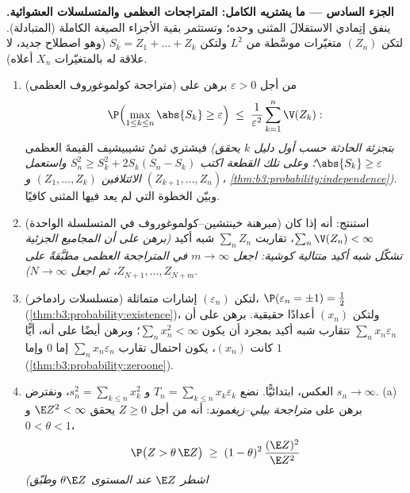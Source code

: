 \begin{problem}
\medskip
\noindent\textbf{الجزء السادس --- ما يشتريه  الكامل:
المتراجحات العظمى والمتسلسلات العشوائية.} ينفق إتِمادي
الاستقلالَ المثنى وحده؛ وتستثمر بقية الأجزاء الصيغة الكاملة
(المتبادلة). لتكن $(Z_n)$ متغيّرات  موسَّطة من $L^2$
ولتكن $S_k = Z_1 + \dots + Z_k$ (وهو اصطلاح جديد، لا علاقة له بالمتغيّرات $X_n$
أعلاه).
\begin{enumerate}[resume]
  \item (متراجحة كولموغوروف العظمى) من أجل $\varepsilon
        > 0$ برهن على
        \[
        \P\Bigl(\max_{1\leq k\leq n}\abs{S_k} \geq
        \varepsilon\Bigr) \;\leq\;
        \frac1{\varepsilon^2}\sum_{k=1}^n\V(Z_k) :
        \]
        فيشتري ثمنُ تشيبيشيف القيمةَ العظمى \emph{(بتجزئة
        الحادثة حسب أول دليل $k$ يحقق $\abs{S_k} \geq \varepsilon$؛ وعلى تلك القطعة
        اكتب $S_n^2 \geq S_k^2 + 2S_k(S_n - S_k)$ واستعمل  الائتلافين $(Z_1, \dots, Z_k)$ و
        $(Z_{k+1}, \dots, Z_n)$، \cref{thm:b3:probability:independence})}. وبيّن الخطوة التي لم يعد فيها
         المثنى كافيًا.
  \item (مبرهنة خينتشين--كولموغوروف في المتسلسلة الواحدة)
        استنتج: أنه إذا كان $\sum_n\V(Z_n) < \infty$، تقاربت $\sum_nZ_n$ شبه
        أكيد \emph{(برهن على أن المجاميع الجزئية تشكّل شبه
        أكيد متتالية كوشية: اجعل $m \to
        \infty$ في المتراجحة العظمى
        مطبَّقةً على $Z_{N+1}, \dots, Z_{N+m}$، ثم اجعل $N \to
        \infty$)}.
  \item (متسلسلات رادماخر) لتكن $(\varepsilon_n)$ إشارات  متماثلة،
        $\P(\varepsilon_n = \pm1) =
        \frac12$ (\cref{thm:b3:probability:existence})، ولتكن $(x_n)$ أعدادًا حقيقية.
        برهن على أن $\sum_nx_n\varepsilon_n$ تتقارب شبه أكيد بمجرد أن يكون
        $\sum_nx_n^2 < \infty$؛ وبرهن أيضًا على أنه، أيًّا كانت $(x_n)$، يكون
        احتمال تقارب $\sum_nx_n\varepsilon_n$ إما $0$ وإما $1$ (\cref{thm:b3:probability:zeroone}).
  \item العكس، ابتدائيًّا. نضع $T_n = \sum_{k\leq
        n}x_k\varepsilon_k$ و $s_n^2 = \sum_{k\leq
        n}x_k^2$، ونفترض
        $s_n \to \infty$.
        (a) برهن على \emph{متراجحة بيلي--زيغموند}: أنه من أجل
        $Z \geq 0$ يحقق $\E Z^2 < \infty$ و $0 < \theta <
        1$،
        \[
        \P\bigl(Z > \theta\,\E Z\bigr) \;\geq\; (1 -
        \theta)^2\,\frac{(\E Z)^2}{\E Z^2}
        \]
        \emph{(اشطر $\E Z$ عند المستوى $\theta\E Z$ وطبّق
}
\end{enumerate}
\end{problem}
